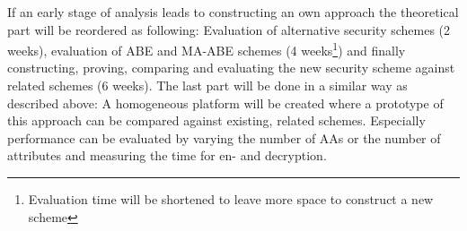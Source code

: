 \documentclass[twocolumn]{article}
\begin{document}
If an early stage of analysis leads to constructing an own approach the theoretical part will be reordered as following: Evaluation of alternative security schemes (2 weeks), evaluation of ABE and MA-ABE schemes (4 weeks\footnote{Evaluation time will be shortened to leave more space to construct a new scheme}) and finally constructing, proving, comparing and evaluating the new security scheme against related schemes (6 weeks). 
The last part will be done in a similar way as described above: A homogeneous platform will be created where a prototype of this approach can be compared against existing, related schemes. Especially performance can be evaluated by varying the number of AAs or the number of attributes and measuring the time for en- and decryption.\\
\end{document}
